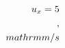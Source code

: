 \documentclass[preview]{standalone}
\begin{document}
\begin{align*}
\special{dvisvgm:raw <g id='unique000'>}u_x = 5\\,\\mathrm{m/s}\special{dvisvgm:raw </g>}
\end{align*}
\end{document}
